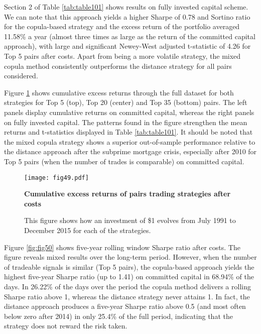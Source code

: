 \documentclass[a4paper]{article}
\begin{document}
\vspace{0.6cm}

Section 2 of Table \ref{tab:table101} shows results on fully invested capital scheme. We can note that this approach yields a higher Sharpe of 0.78 and Sortino ratio for the copula-based strategy and the excess return of the portfolio averaged 11.58\% a year (almost three times as large as the return of the committed capital approach), with large and significant Newey-West adjusted t-statistic of 4.26 for Top 5 pairs after costs. Apart from being a more volatile strategy, the mixed copula method consistently outperforms the distance strategy for all pairs considered.

Figure \ref{fig:fig49} shows cumulative excess returns through the full dataset for both strategies for Top 5 (top), Top 20 (center) and Top 35 (bottom) pairs. The left panels display cumulative returns on committed capital, whereas the right panels on fully invested capital. The patterns found in the figure strengthen the mean returns and t-statistics displayed in Table \ref{tab:table101}. It should be noted that the mixed copula strategy shows a superior out-of-sample performance relative to the distance approach after the subprime mortgage crisis, especially after 2010 for Top 5 pairs (when the number of trades is comparable) on committed capital. 

\begin{figure}[H]
	\centering
	\texttt{[image: fig49.pdf]}
	\captionsetup{justification=raggedright,
		singlelinecheck=false
	}
	\caption{\textbf{Cumulative excess returns of pairs trading strategies after costs}}
	\caption*{\scriptsize This figure shows how an investment of \$1 evolves from July 1991 to December 2015 for each of the strategies.}
	\label{fig:fig49}
\end{figure}

Figure \ref{fig:fig50} shows five-year rolling window Sharpe ratio after costs. The figure reveals mixed results over the long-term period. However, when the number of tradeable signals is similar (Top 5 pairs), the copula-based approach yields the highest five-year Sharpe ratio (up to 1.41) on committed capital in 68.94\% of the days. In 26.22\% of the days over the period the copula method delivers a rolling Sharpe ratio above 1, whereas the distance strategy never attains 1. In fact, the distance approach produces a five-year Sharpe ratio above 0.5 (and most often below zero after 2014) in only 25.4\% of the full period, indicating that the strategy does not reward the risk taken.
\end{document}
